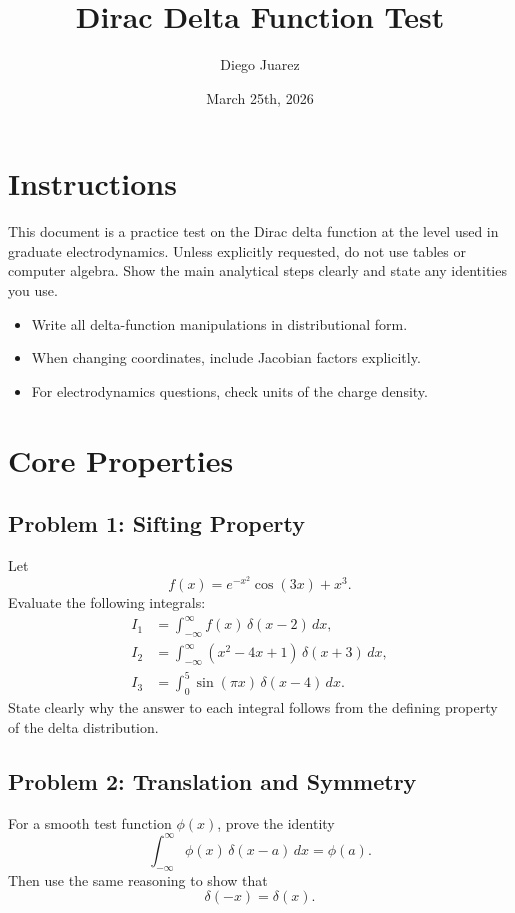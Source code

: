 \documentclass[hidelinks]{article}
\title{\textbf{Dirac Delta Function Test}}
\author{Diego Juarez}
\date{March 25th, 2026}
\begin{document}
\hypersetup{bookmarksnumbered=true}
\pagecolor{black}
\color{white}
\maketitle

\begin{Large}
\tableofcontents
\end{Large}
\pagebreak

\section{Instructions}
This document is a practice test on the Dirac delta function at the level used in graduate electrodynamics. Unless explicitly requested, do not use tables or computer algebra. Show the main analytical steps clearly and state any identities you use.

\begin{itemize}[label=--]
\item Write all delta-function manipulations in distributional form.
\item When changing coordinates, include Jacobian factors explicitly.
\item For electrodynamics questions, check units of the charge density.
\end{itemize}

\section{Core Properties}

\subsection{Problem 1: Sifting Property}
Let
\[
f(x)=e^{-x^2}\cos(3x)+x^3.
\]
Evaluate the following integrals:
\begin{align*}
I_1 &= \int_{-\infty}^{\infty} f(x)\,\delta(x-2)\,dx,\\
I_2 &= \int_{-\infty}^{\infty} (x^2-4x+1)\,\delta(x+3)\,dx,\\
I_3 &= \int_{0}^{5} \sin(\pi x)\,\delta(x-4)\,dx.
\end{align*}
State clearly why the answer to each integral follows from the defining property of the delta distribution.

\subsection{Problem 2: Translation and Symmetry}
For a smooth test function $\phi(x)$, prove the identity
\[
\int_{-\infty}^{\infty} \phi(x)\,\delta(x-a)\,dx = \phi(a).
\]
Then use the same reasoning to show that
\[
\delta(-x)=\delta(x).
\]
\end{document}
